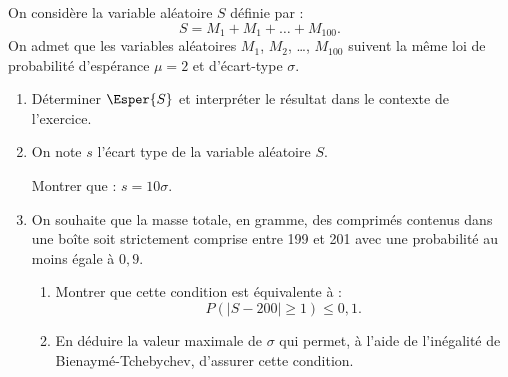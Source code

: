 \smallskip

On considère la variable aléatoire $S$ définie par : \[ S=M_1+M_1+\ldots+M_{100}. \]
%
On admet que les variables aléatoires $M_1$, $M_2$, \ldots, $M_{100}$ suivent la même loi de probabilité d'espérance $\mu=2$ et d'écart-type $\sigma$.

\begin{enumerate}
	\item Déterminer $\Esper{S}$ et interpréter le résultat dans le contexte de l'exercice.
	\item On note $s$ l'écart type de la variable aléatoire $S$.
	
	Montrer que : $s = 10\sigma$.
	\item On souhaite que la masse totale, en gramme, des comprimés contenus dans une boîte
	soit strictement comprise entre 199 et 201 avec une probabilité au moins égale à $0,9$.
	\begin{enumerate}
		\item Montrer que cette condition est équivalente à : \[ P(|S-200| \geqslant 1) \leqslant 0,1. \]
		\item En déduire la valeur maximale de $\sigma$ qui permet, à l'aide de l'inégalité de Bienaymé­-Tchebychev, d'assurer cette condition. 
	\end{enumerate}
\end{enumerate}